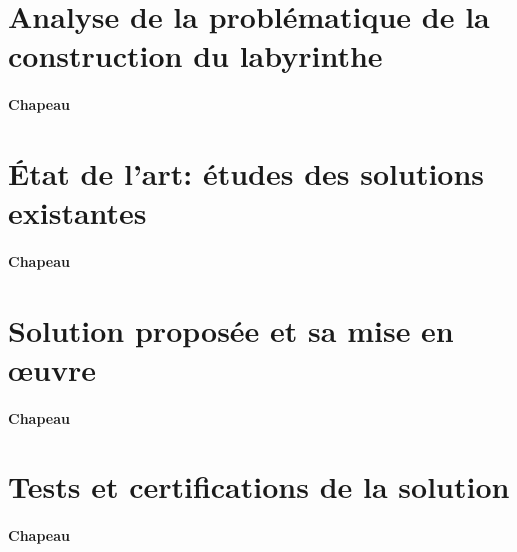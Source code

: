 \section{Analyse de la problématique de la construction du labyrinthe} 
\label{sec:ProblematiqueConstructionLabyrinthe}

\paragraph{Chapeau}


\section{État de l’art: études des solutions existantes} \label{sec:etatDeLart2}

\paragraph{Chapeau}


\section{Solution proposée et sa mise en œuvre} \label{sec:solution2}

\paragraph{Chapeau}


\section{Tests et certifications de la solution} \label{sec:test2}

\paragraph{Chapeau}
